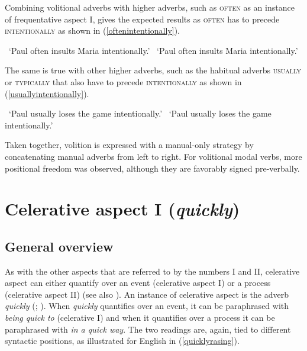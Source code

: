 Combining volitional adverbs with higher adverbs, such as \textsc{often} as an instance of frequentative aspect I, gives the expected results as \textsc{often} has to precede \textsc{intentionally} as shown in (\ref{oftenintentionally}). 

\begin{exe}
\ex\label{oftenintentionally}\begin{xlist} 
\glt \textcolor{white}{*}`Paul often insults Maria intentionally.' \label{ex:oftenintentionallya}
\glt \textcolor{white}{*}`Paul often insults Maria intentionally.'  \label{ex:oftenintentionallyb}
\end{xlist}
\end{exe} 

\noindent The same is true with other higher adverbs, such as the habitual adverbs \textsc{usually} or \textsc{typically} that also have to precede \textsc{intentionally} as shown in (\ref{usuallyintentionally}).

\begin{exe}
\ex\label{usuallyintentionally}\begin{xlist} 
\glt \textcolor{white}{*}`Paul usually loses the game intentionally.' \label{ex:usuallyintentionallya}
\glt \textcolor{white}{*}`Paul usually loses the game intentionally.'  \label{ex:usuallyintentionallyb}
\end{xlist}
\end{exe} 

\noindent Taken together, volition is expressed with a manual-only strategy by concatenating manual adverbs from left to right. For volitional modal verbs, more positional freedom was observed, although they are favorably signed pre-verbally.


\section{Celerative aspect I (\textit{quickly})}\label{celerativeone}
\subsection{General overview}
As with the other aspects that are referred to by the numbers I and II, celerative aspect can either quantify over an event (celerative aspect I) or a process (celerative aspect II) (see also \citealt{travis1988syntax, tennyl2000core, ernst2002syntax}). An instance of celerative aspect is the adverb \textit{quickly} (\citealt[292]{travis1988syntax}; \citealt[93]{cinque1999adverbs}). When \textit{quickly} quantifies over an event, it can be paraphrased with \textit{being quick to} (celerative I) and when it quantifies over a process it can be paraphrased with \textit{in a quick way}. The two readings are, again, tied to different syntactic positions, as illustrated for English in (\ref{quicklyrasing}).

